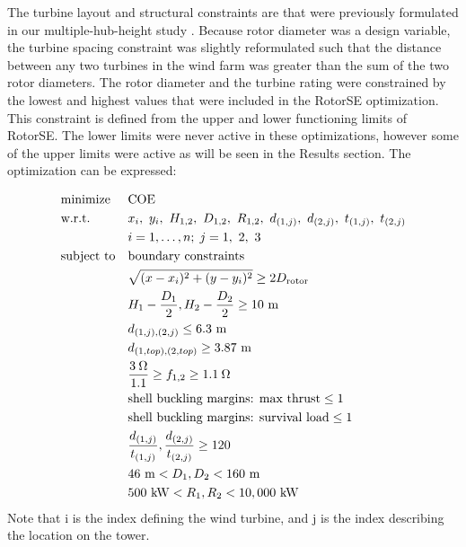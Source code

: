              
          The turbine layout and structural constraints are that were previously formulated in our multiple-hub-height study \citep{stanley2018}. Because rotor diameter was a design variable, the turbine spacing constraint was slightly reformulated such that the distance between any two turbines in the wind farm was greater than the sum of the two rotor diameters.
           The rotor diameter and the turbine rating were constrained by the lowest and highest values that were included in the RotorSE optimization. This constraint is defined from the upper and lower functioning limits of RotorSE. The lower limits were never active in these optimizations, however some of the upper limits were active as will be seen in the Results section.
       The optimization can be expressed:
        
        
        \begin{equation}
			\begin{aligned}
				& \text{minimize}
					& & \text{COE} \\
                & \text{w.r.t.} 
                	&& x_i,~ y_i,~ H_{1,2},~ D_{1,2},~ R_{1,2},~ d_{(1,j)},~ d_{(2,j)},~ t_{(1,j)},~t_{(2,j)}\\
                		&&& i = 1, \ldots, n; \; j = 1,~2,~3 \\
				& \text{subject to}
					& & \text{boundary constraints} \\
						&&& \sqrt{(x-x_i)^2+(y-y_i)^2} \geq 2D_{\text{rotor}} \\
						&&& H_1-\frac{D_1}{2}, H_2-\frac{D_2}{2} \geq 10~ \text{m}\\
                		&&& d_{(1,j),(2,j)} \leq 6.3~ \text{m}\\
                		&&& d_{(1,top),(2,top)} \geq 3.87~ \text{m}\\
						&&& \frac{3\hspace{0.08cm}\Omega}{1.1} \geq f_{1,2} \geq 1.1\hspace{0.08cm}\Omega \\
                		&&& \text{shell buckling margins: max thrust} \leq 1 \\
                        &&& \text{shell buckling margins: survival load} \leq 1 \\
                		&&& \frac{d_{(1,j)}}{t_{(1,j)}},\frac{d_{(2,j)}}{t_{(2,j)}} \geq 120\\
                        &&& 46~ \text{m} < D_1,D_2 < 160~ \text{m}  \\
                        &&& 500~ \text{kW} < R_1,R_2 < 10,000~ \text{kW} \\
			\end{aligned}
		\end{equation}
%
Note that i is the index defining the wind turbine, and j is the index describing the location on the tower.
        
